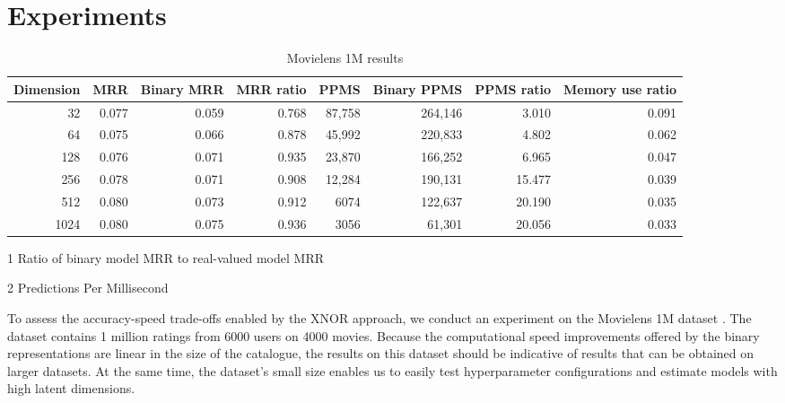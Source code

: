 \documentclass[sigchi]{acmart}
\begin{document}
\section{Experiments}
\begin{table*}[htbp]
\begin{threeparttable}
\caption{Movielens 1M results}
\label{tb:results}
\centering
\begin{tabular}{rrrrrrrr}
\toprule
Dimension &   MRR & Binary MRR & MRR ratio\tnote{1} &   PPMS\tnote{2} & Binary PPMS & PPMS ratio & Memory use ratio \\
\midrule
       32 & 0.077 &      0.059 &     0.768 & 87,758 &     264,146 &      3.010 &            0.091 \\
       64 & 0.075 &      0.066 &     0.878 & 45,992 &     220,833 &      4.802 &            0.062 \\
      128 & 0.076 &      0.071 &     0.935 & 23,870 &     166,252 &      6.965 &            0.047 \\
      256 & 0.078 &      0.071 &     0.908 & 12,284 &     190,131 &     15.477 &            0.039 \\
      512 & 0.080 &      0.073 &     0.912 &   6074 &     122,637 &     20.190 &            0.035 \\
     1024 & 0.080 &      0.075 &     0.936 &   3056 &      61,301 &     20.056 &            0.033 \\
\bottomrule
\end{tabular}
\begin{tablenotes}
\small{
\item[1] Ratio of binary model MRR to real-valued model MRR
\item[2] Predictions Per Millisecond
}
\end{tablenotes}
\end{threeparttable}
\end{table*}
To assess the accuracy-speed trade-offs enabled by the XNOR approach, we conduct an experiment on the Movielens 1M dataset \citep{harper2016movielens}. The dataset contains 1 million ratings from 6000 users on 4000 movies. Because the computational speed improvements offered by the binary representations are linear in the size of the catalogue, the results on this dataset should be indicative of results that can be obtained on larger datasets. At the same time, the dataset's small size enables us to easily test hyperparameter configurations and estimate models with high latent dimensions.
\end{document}
